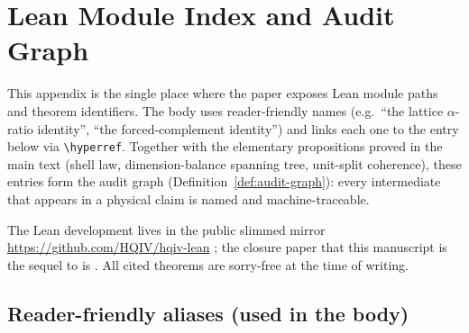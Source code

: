 \documentclass[11pt]{amsart}
\begin{document}
\section{Lean Module Index and Audit Graph}
\label{sec:lean-certs}

This appendix is the single place where the paper exposes Lean module paths and theorem identifiers. The body uses reader-friendly names (e.g.\ ``the lattice \(\alpha\)-ratio identity'', ``the forced-complement identity'') and links each one to the entry below via \verb|\hyperref|. Together with the elementary propositions proved in the main text (shell law, dimension-balance spanning tree, unit-split coherence), these entries form the audit graph (Definition~\ref{def:audit-graph}): every intermediate that appears in a physical claim is named and machine-traceable.

The Lean development lives in the public slimmed mirror \url{https://github.com/HQIV/hqiv-lean} \cite{hqiv-lean}; the closure paper that this manuscript is the sequel to is \cite{hqiv-so8-paper}. All cited theorems are sorry-free at the time of writing.

\subsection{Reader-friendly aliases (used in the body)}
\label{subsec:lean-aliases}
\end{document}
